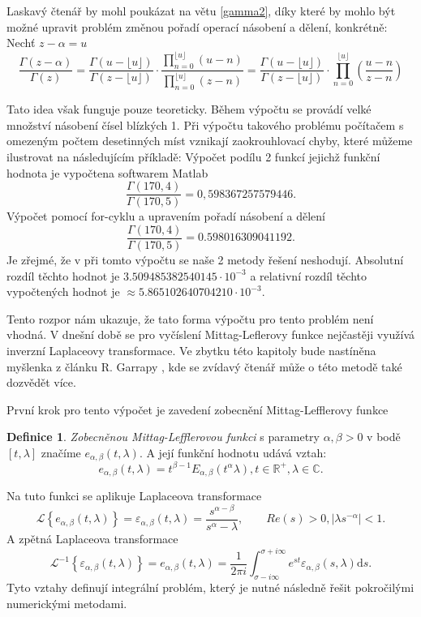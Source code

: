 \documentclass[a4paper,12pt,twoside]{article}
\theoremstyle{definition}
\newtheorem{defin}[veta]{Definice}
\theoremstyle{remark}
\numberwithin{equation}{section}
\numberwithin{table}{section}
\numberwithin{figure}{section}
\newcommand{\dx}[1]{\mathrm{d} #1}
\newcommand{\R}{\mathbb{R}}
\newcommand{\C}{\mathbb{C}}
\begin{document}
Laskavý čtenář by mohl poukázat na větu \ref{gamma2}, díky které by mohlo být možné upravit problém změnou pořadí operací násobení a dělení, konkrétně:
Nechť $z-\alpha = u$
$$\frac{\Gamma\left(z - \alpha\right)}{\Gamma\left(z\right)} = 
\frac{\Gamma\left(u-\lfloor u\rfloor \right)}{\Gamma \left(z - \lfloor u\rfloor \right)} \cdot \frac{\prod_{n=0}^{\lfloor u \rfloor } \left(u-n\right)}{\prod_{n=0}^{\lfloor u\rfloor} \left(z-n\right)}  = 
\frac{\Gamma\left(u-\lfloor u\rfloor \right)}{\Gamma \left(z - \lfloor u\rfloor \right)} \cdot \prod_{n=0}^{\lfloor u \rfloor} \left(\frac{u-n}{z-n}\right)  $$

Tato idea však funguje pouze teoreticky. Během výpočtu se provádí velké množství násobení čísel blízkých 1. Při výpočtu takového problému počítačem s omezeným počtem desetinných míst vznikají zaokrouhlovací chyby, které můžeme ilustrovat na následujícím příkladě:
Výpočet podílu 2 funkcí jejichž funkční hodnota je vypočtena softwarem Matlab
$$\frac{\Gamma\left(170,4\right)}{\Gamma\left(170,5\right)} = 0,598367257579446.$$
Výpočet pomocí for-cyklu a upravením pořadí násobení a dělení
 $$ \frac{\Gamma\left(170,4\right)}{\Gamma\left(170,5\right)} = 0.598016309041192.$$
 Je zřejmé, že v při tomto výpočtu se naše 2 metody řešení neshodují. Absolutní rozdíl těchto hodnot je $3.509485382540145 \cdot 10^{-3} $ a relativní rozdíl těchto vypočtených hodnot je $\approx 5.865102640704210\cdot 10^{-3}$. 
 
 Tento rozpor nám ukazuje, že tato forma výpočtu pro tento problém není vhodná. V dnešní době se pro vyčíslení Mittag-Leflerovy funkce nejčastěji využívá inverzní Laplaceovy transformace. Ve zbytku této kapitoly bude nastíněna myšlenka z článku R. Garrapy \cite{Garrappa}, kde se zvídavý čtenář může o této metodě také dozvědět více.

První krok pro tento výpočet je zavedení zobecnění Mittag-Lefflerovy funkce
\begin{defin}
	\emph{Zobecněnou Mittag-Lefflerovou funkci} s parametry $\alpha, \beta > 0$ v bodě $\left[t,\lambda \right]$ značíme $e_{\alpha, \beta}\left(t,\lambda\right)$. A její funkční hodnotu udává vztah:
	$$e_{\alpha, \beta}\left(t,\lambda\right) = t^{\beta - 1} E_{\alpha,\beta} \left(t^{\alpha}\lambda\right), t \in \R^{+}, \lambda \in \C.$$
\end{defin}
Na tuto funkci se aplikuje Laplaceova transformace
\begin{equation}
	 \mathcal{L}\left\lbrace e_{\alpha, \beta}\left(t,\lambda\right) \right\rbrace = \varepsilon_{\alpha, \beta} \left(t,\lambda \right)  = \frac{s^{\alpha-\beta}}{s^{\alpha} - \lambda}, \qquad Re(s) > 0, |\lambda s^{-\alpha}|<1.
\end{equation}
A zpětná Laplaceova transformace
\begin{equation}
	\mathcal{L}^{-1} \left\lbrace \varepsilon_{\alpha, \beta} \left(t,\lambda \right) \right\rbrace  = e_{\alpha, \beta}\left(t,\lambda\right) = \frac{1}{2\pi i} \int_{\sigma-i \infty}^{\sigma+i \infty} e^{st}\varepsilon_{\alpha, \beta}\left(s,\lambda\right)\dx s.
\end{equation}
Tyto vztahy definují integrální problém, který je nutné následně řešit pokročilými numerickými metodami.
\end{document}
